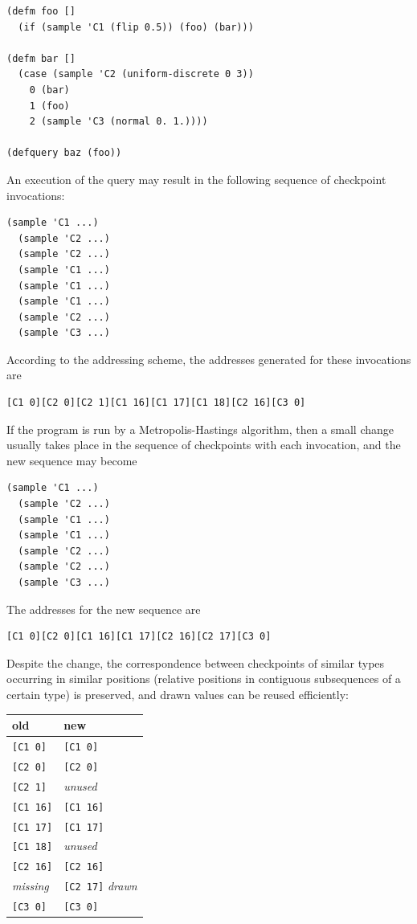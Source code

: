 \documentclass[sigconf]{acmart}
\begin{document}
\begin{lstlisting}[style=default]
(defm foo []
  (if (sample 'C1 (flip 0.5)) (foo) (bar)))

(defm bar []
  (case (sample 'C2 (uniform-discrete 0 3))
    0 (bar)
    1 (foo)
    2 (sample 'C3 (normal 0. 1.))))

(defquery baz (foo))
\end{lstlisting}
An execution of the query may result in the following
sequence of checkpoint invocations:
\begin{lstlisting}[style=default]
  (sample 'C1 ...)
  (sample 'C2 ...)
  (sample 'C2 ...)
  (sample 'C1 ...)
  (sample 'C1 ...)
  (sample 'C1 ...)
  (sample 'C2 ...)
  (sample 'C3 ...)
\end{lstlisting}
According to the addressing scheme, the addresses generated
for these invocations are
\begin{lstlisting}[style=default]
[C1 0][C2 0][C2 1][C1 16][C1 17][C1 18][C2 16][C3 0]
\end{lstlisting}
If the program is run by a Metropolis-Hastings algorithm, then a
small change usually takes place in the sequence of checkpoints
with each invocation, and the new sequence may become
\begin{lstlisting}[style=default]
  (sample 'C1 ...)
  (sample 'C2 ...)
  (sample 'C1 ...)
  (sample 'C1 ...)
  (sample 'C2 ...)
  (sample 'C2 ...)
  (sample 'C3 ...)
\end{lstlisting}
The addresses for the new sequence are
\begin{lstlisting}[style=default]
  [C1 0][C2 0][C1 16][C1 17][C2 16][C2 17][C3 0]
\end{lstlisting}
Despite the change, the correspondence between checkpoints of
similar types occurring in similar positions (relative positions
in contiguous subsequences of a certain type) is preserved, and
drawn values can be reused efficiently:

\vspace{\baselineskip}
{
\begin{tabular}{l l}
    \textbf{old} & \textbf{new} \\ \hline
    {}\texttt{[C1 0]} & \texttt{[C1 0]} \\
    {}\texttt{[C2 0]} & \texttt{[C2 0]} \\
    {}\texttt{[C2 1]} & \textit{unused} \\
    {}\texttt{[C1 16]} & \texttt{[C1 16]} \\
    {}\texttt{[C1 17]} & \texttt{[C1 17]} \\
    {}\texttt{[C1 18]} & \textit{unused} \\
    {}\texttt{[C2 16]} & \texttt{[C2 16]} \\
    \textit{missing} & \texttt{[C2 17]} \textit{drawn}\\
    {}\texttt{[C3 0]} & \texttt{[C3 0]}
\end{tabular}
\vspace{\baselineskip}}
\end{document}
